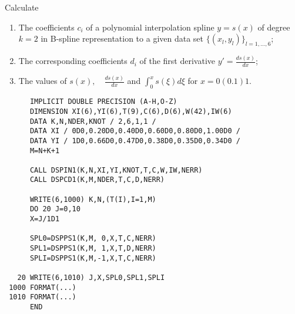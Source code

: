 \Examples
Calculate
\begin{enumerate}
\item
The coefficients $c_i$ of
a polynomial interpolation spline $y=s(x)$ of degree $k=2$ in B-spline
representation to a given data set $\{(x_l,y_l)\}_{l=1,\ldots,6}$;
\item
The corresponding coefficients $d_i$ of the first derivative \quad
$\displaystyle y'=$;
\item
The values of \quad $s(x), \quad \displaystyle {}$ \quad
and \quad $\displaystyle \int_0^x s(\xi)d\xi$ \quad for $x=0(0.1)1$.
\end{enumerate}
\begin{verbatim}
      IMPLICIT DOUBLE PRECISION (A-H,O-Z)
      DIMENSION XI(6),YI(6),T(9),C(6),D(6),W(42),IW(6)
      DATA K,N,NDER,KNOT / 2,6,1,1 /
      DATA XI / 0D0,0.20D0,0.40D0,0.60D0,0.80D0,1.00D0 /
      DATA YI / 1D0,0.66D0,0.47D0,0.38D0,0.35D0,0.34D0 /
      M=N+K+1
 
      CALL DSPIN1(K,N,XI,YI,KNOT,T,C,W,IW,NERR)
      CALL DSPCD1(K,M,NDER,T,C,D,NERR)
 
      WRITE(6,1000) K,N,(T(I),I=1,M)
      DO 20 J=0,10
      X=J/1D1
 
      SPL0=DSPPS1(K,M, 0,X,T,C,NERR)
      SPL1=DSPPS1(K,M, 1,X,T,D,NERR)
      SPLI=DSPPS1(K,M,-1,X,T,C,NERR)
 
   20 WRITE(6,1010) J,X,SPL0,SPL1,SPLI
 1000 FORMAT(...)
 1010 FORMAT(...)
      END
\end{verbatim}
